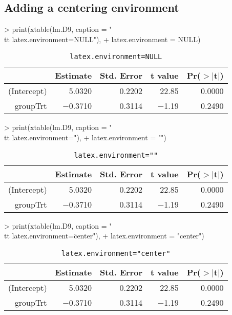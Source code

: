 \documentclass[letterpaper]{article}
\begin{document}
\subsection{Adding a centering environment }
\begin{Schunk}
\begin{Sinput}
> print(xtable(lm.D9, caption = "\\tt latex.environment=NULL"), 
+     latex.environment = NULL)
\end{Sinput}
% latex table generated in R 2.6.0 by xtable 1.5-2 package
% Wed Oct 10 14:26:37 2007
\begin{table}[ht]
\begin{tabular}{rrrrr}
  \hline
 & Estimate & Std. Error & t value & Pr($>$$|$t$|$) \\
  \hline
(Intercept) & 5.0320 & 0.2202 & 22.85 & 0.0000 \\
  groupTrt & $-$0.3710 & 0.3114 & $-$1.19 & 0.2490 \\
   \hline
\end{tabular}
\caption{\tt latex.environment=NULL}
\end{table}\begin{Sinput}
> print(xtable(lm.D9, caption = "\\tt latex.environment=\"\""), 
+     latex.environment = "")
\end{Sinput}
% latex table generated in R 2.6.0 by xtable 1.5-2 package
% Wed Oct 10 14:26:37 2007
\begin{table}[ht]
\begin{tabular}{rrrrr}
  \hline
 & Estimate & Std. Error & t value & Pr($>$$|$t$|$) \\
  \hline
(Intercept) & 5.0320 & 0.2202 & 22.85 & 0.0000 \\
  groupTrt & $-$0.3710 & 0.3114 & $-$1.19 & 0.2490 \\
   \hline
\end{tabular}
\caption{\tt latex.environment=""}
\end{table}\begin{Sinput}
> print(xtable(lm.D9, caption = "\\tt latex.environment=\"center\""), 
+     latex.environment = "center")
\end{Sinput}
% latex table generated in R 2.6.0 by xtable 1.5-2 package
% Wed Oct 10 14:26:37 2007
\begin{table}[ht]
\begin{center}
\begin{tabular}{rrrrr}
  \hline
 & Estimate & Std. Error & t value & Pr($>$$|$t$|$) \\
  \hline
(Intercept) & 5.0320 & 0.2202 & 22.85 & 0.0000 \\
  groupTrt & $-$0.3710 & 0.3114 & $-$1.19 & 0.2490 \\
   \hline
\end{tabular}
\caption{\tt latex.environment="center"}
\end{center}
\end{table}\end{Schunk}
\end{document}
